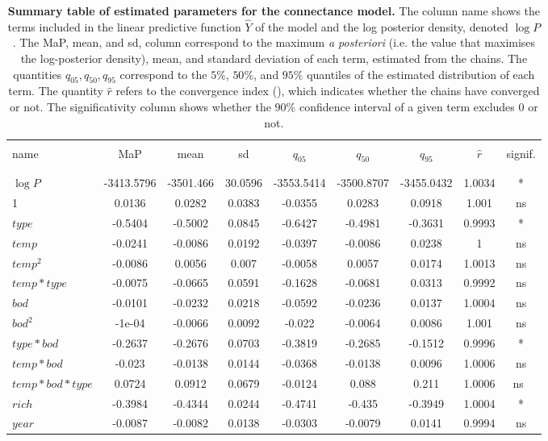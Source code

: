 \documentclass[11pt, oneside]{article}
\begin{document}
\begin{table}[H]
    \caption{
        \textbf{Summary table of estimated parameters for the connectance model.}
        The column name shows the terms included in the linear predictive function $\hat{Y}$ of the model and the log posterior density, denoted $\log P$.
        The MaP, mean, and sd, column correspond to the maximum \textit{a posteriori} (i.e. the value that maximises the log-posterior density), mean, and standard deviation of each term, estimated from the chains.
        The quantities $q_{05}, q_{50}, q_{95}$ correspond to the $5\%$, $50\%$, and $95\%$ quantiles of the estimated distribution of each term.
        The quantity $\hat{r}$ refers to the convergence index (\cite{Gelman1995}), which indicates whether the chains have converged or not.
        The significativity column shows whether the $90\%$ confidence interval of a given term excludes 0 or not.
    }
    \begin{center}
    \begin{tabular}{lcccccccc}
        \hline
        \\
        name & MaP & mean & sd & $q_{05}$ & $q_{50}$ & $q_{95}$ & $\hat{r}$ & signif. \\
        \\
        \hline
        \\
        $\log P$ & -3413.5796 & -3501.466 & 30.0596 & -3553.5414 & -3500.8707 & -3455.0432 & 1.0034 & * \\
        1 & 0.0136 & 0.0282 & 0.0383 & -0.0355 & 0.0283 & 0.0918 & 1.001 & ns \\
        $type$ & -0.5404 & -0.5002 & 0.0845 & -0.6427 & -0.4981 & -0.3631 & 0.9993 & * \\
        $temp$ & -0.0241 & -0.0086 & 0.0192 & -0.0397 & -0.0086 & 0.0238 & 1 & ns \\
        $temp^2$ & -0.0086 & 0.0056 & 0.007 & -0.0058 & 0.0057 & 0.0174 & 1.0013 & ns \\
        $temp*type$ & -0.0075 & -0.0665 & 0.0591 & -0.1628 & -0.0681 & 0.0313 & 0.9992 & ns \\
        $bod$ & -0.0101 & -0.0232 & 0.0218 & -0.0592 & -0.0236 & 0.0137 & 1.0004 & ns \\
        $bod^2$ & -1e-04 & -0.0066 & 0.0092 & -0.022 & -0.0064 & 0.0086 & 1.001 & ns \\
        $type*bod$ & -0.2637 & -0.2676 & 0.0703 & -0.3819 & -0.2685 & -0.1512 & 0.9996 & * \\
        $temp*bod$ & -0.023 & -0.0138 & 0.0144 & -0.0368 & -0.0138 & 0.0096 & 1.0006 & ns \\
        $temp*bod*type$ & 0.0724 & 0.0912 & 0.0679 & -0.0124 & 0.088 & 0.211 & 1.0006 & ns \\
        $rich$ & -0.3984 & -0.4344 & 0.0244 & -0.4741 & -0.435 & -0.3949 & 1.0004 & * \\
        $year$ & -0.0087 & -0.0082 & 0.0138 & -0.0303 & -0.0079 & 0.0141 & 0.9994 & ns \\ 
    \end{tabular}
    \end{center}
\end{table}
\end{document}
